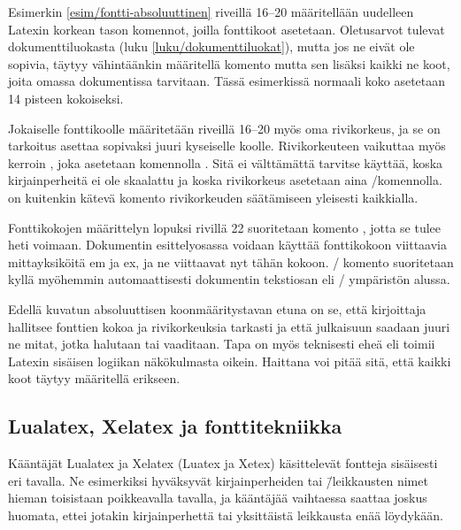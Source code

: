 \begin{koodilohkosis}
\sffamilyabs\Large\bfseries
\end{koodilohkosis}

\noindent
Esimerkin \ref{esim/fontti-absoluuttinen} riveillä 16--20 määritellään
uudelleen Latexin korkean tason komennot, joilla fonttikoot asetetaan.
Oletusarvot tulevat dokumenttiluokasta (luku
\ref{luku/dokumenttiluokat}), mutta jos ne eivät ole sopivia, täytyy
vähintäänkin määritellä komento  mutta sen lisäksi
kaikki ne koot, joita omassa dokumentissa tarvitaan. Tässä esimerkissä
normaali koko asetetaan 14 pisteen kokoiseksi.

Jokaiselle fonttikoolle määritetään riveillä 16--20 myös oma
rivikorkeus, ja se on tarkoitus asettaa sopivaksi juuri kyseiselle
koolle. Rivikorkeuteen vaikuttaa myös kerroin ,
joka asetetaan komennolla . Sitä ei välttämättä
tarvitse käyttää, koska kirjainperheitä ei ole skaalattu ja koska
rivikorkeus asetetaan aina \-/komennolla.
 on kuitenkin kätevä komento rivikorkeuden
säätämiseen yleisesti kaikkialla.

Fonttikokojen määrittelyn lopuksi rivillä 22 suoritetaan komento
, jotta se tulee heti voimaan. Dokumentin
esittelyosassa voidaan käyttää fonttikokoon viittaavia mittayksiköitä em
ja ex, ja ne viittaavat nyt tähän kokoon. \-/
komento suoritetaan kyllä myöhemmin automaattisesti dokumentin
tekstiosan eli \-/ ympäristön alussa.

Edellä kuvatun absoluuttisen koonmääritystavan etuna on se, että
kirjoittaja hallitsee fonttien kokoa ja rivikorkeuksia tarkasti ja että
julkaisuun saadaan juuri ne mitat, jotka halutaan tai vaaditaan. Tapa on
myös teknisesti eheä eli toimii Latexin sisäisen logiikan näkökulmasta
oikein. Haittana voi pitää sitä, että kaikki koot täytyy määritellä
erikseen.

\subsection{Lualatex, Xelatex ja fonttitekniikka}
\label{luku/luatex-xetex-fonttitekn}

Kääntäjät Lualatex ja Xelatex (Luatex ja Xetex) käsittelevät fontteja
sisäisesti eri tavalla. Ne esimerkiksi hyväksyvät kirjainperheiden tai
\=/leikkausten nimet hieman toisistaan poikkeavalla tavalla, ja
kääntäjää vaihtaessa saattaa joskus huomata, ettei jotakin
kirjainperhettä tai yksittäistä leikkausta enää löydykään.

